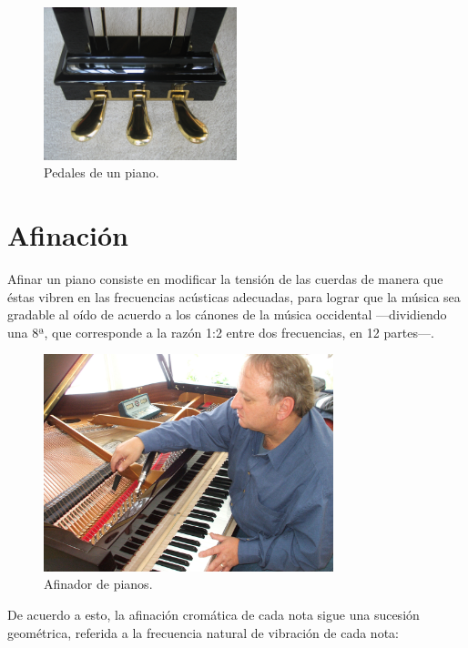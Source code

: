 \documentclass[10pt,a4paper]{article}
\begin{document}
	\begin{figure}[!ht]
		\centering
		\includegraphics[width=0.5\textwidth]{images/pedals}
		\caption[Pedales de un piano]{\label{fig:pedals} Pedales de un piano.}
	\end{figure}
	
	
	\clearpage
	\section{Afinación}
	
	Afinar un piano consiste en modificar la tensión de las cuerdas de manera 
	que éstas vibren en las frecuencias acústicas adecuadas, para lograr que la 
	música sea gradable al oído de acuerdo a los cánones de la música 
	occidental ---dividiendo una 8ª, que corresponde a la razón 1:2 entre dos 
	frecuencias, en 12 partes---.
	
	\begin{figure}[!ht]
		\centering
		\includegraphics[width=0.75\textwidth]{images/tuner}
		\caption[Afinador de pianos]{\label{fig:tuner} Afinador de pianos.}
	\end{figure}
	
	De acuerdo a esto, la afinación cromática de cada nota sigue una sucesión 
	geométrica, referida a la frecuencia natural de vibración de cada nota:
	
\end{document}
